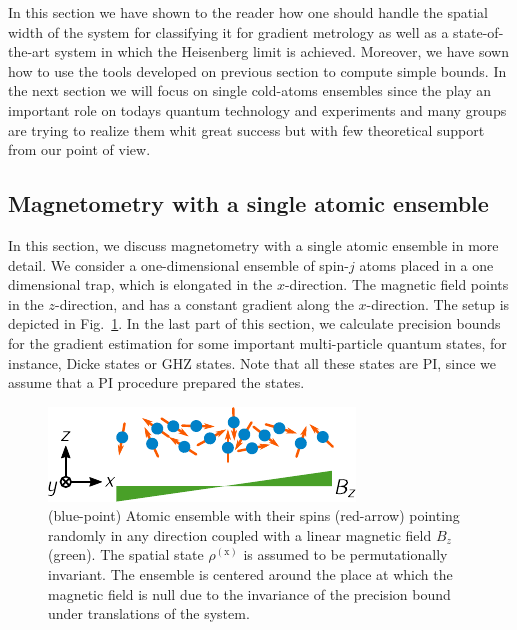 In this section we have shown to the reader how one should handle the spatial width of the system for classifying it for gradient metrology as well as a state-of-the-art system in which the Heisenberg limit is achieved. Moreover, we have sown how to use the tools developed on previous section to compute simple bounds. In the next section we will focus on single cold-atoms ensembles since the play an important role on todays quantum technology and experiments and many groups are trying to realize them whit great success but with few theoretical support from our point of view.

\subsection{Magnetometry with a single atomic ensemble}
\label{sec:gm-single-cloud}

In this section, we discuss magnetometry with a single
atomic ensemble in more detail.
We consider a one-dimensional ensemble of spin-$j$ atoms
placed in a one dimensional trap, which is elongated
in the  $x$-direction.
The magnetic field points in the $z$-direction,
and has a constant gradient along the $x$-direction.
The setup is depicted
in Fig.~\ref{fig:gm-single-ensemble-in-gradient}.
In the last part of this section, we calculate precision bounds for the
gradient estimation for some important multi-particle quantum states,
for instance, Dicke states or GHZ states.
Note that all these states are PI, since we
assume that a PI procedure prepared the states.
\begin{figure}[htp]
  \begin{center}
  \includegraphics[scale=1.2]{img/GM_single_cloud.pdf}
  \caption[Single atomic ensemble for gradient magnetometry]{(blue-point) Atomic ensemble with their spins (red-arrow) pointing randomly in any direction coupled with a linear magnetic field $B_z$ (green).
  The spatial state $\rho^{(\text{x})}$ is assumed to be permutationally invariant.
  The ensemble is centered around the place at which the magnetic field is null due to the invariance of the precision bound under translations of the system.}
  \label{fig:gm-single-ensemble-in-gradient}
  \end{center}
\end{figure}

